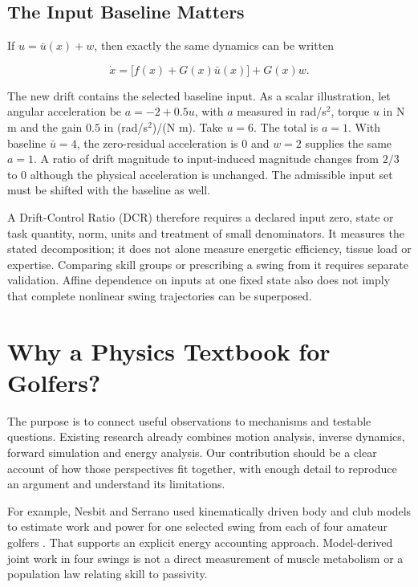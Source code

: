 \subsection{The Input Baseline Matters}\label{ch01:the-input-baseline-matters}

If \(u=\bar u(x)+w\), then exactly the same dynamics can be written

\[
\dot x=\bigl[f(x)+G(x)\bar u(x)\bigr]+G(x)w.
\]

The new drift contains the selected baseline input. As a scalar illustration, let angular acceleration be \(a=-2+0.5u\), with \(a\) measured in rad/s\(^2\), torque \(u\) in N m and the gain \(0.5\) in (rad/s\(^2\))/(N m). Take \(u=6\). The total is \(a=1\). With baseline \(\bar u=4\), the zero-residual acceleration is \(0\) and \(w=2\) supplies the same \(a=1\). A ratio of drift magnitude to input-induced magnitude changes from \(2/3\) to \(0\) although the physical acceleration is unchanged. The admissible input set must be shifted with the baseline as well.

A Drift-Control Ratio (DCR) therefore requires a declared input zero, state or task quantity, norm, units and treatment of small denominators. It measures the stated decomposition; it does not alone measure energetic efficiency, tissue load or expertise. Comparing skill groups or prescribing a swing from it requires separate validation. Affine dependence on inputs at one fixed state also does not imply that complete nonlinear swing trajectories can be superposed.

\protect{}\label{ch01:why-physics-matters}{}

\section{Why a Physics Textbook for Golfers?}\label{ch01:why-a-physics-textbook-for-golfers}

The purpose is to connect useful observations to mechanisms and testable questions. Existing research already combines motion analysis, inverse dynamics, forward simulation and energy analysis. Our contribution should be a clear account of how those perspectives fit together, with enough detail to reproduce an argument and understand its limitations.

For example, Nesbit and Serrano used kinematically driven body and club models to estimate work and power for one selected swing from each of four amateur golfers \citep{Nesbit2005b}. That supports an explicit energy accounting approach. Model-derived joint work in four swings is not a direct measurement of muscle metabolism or a population law relating skill to passivity.

